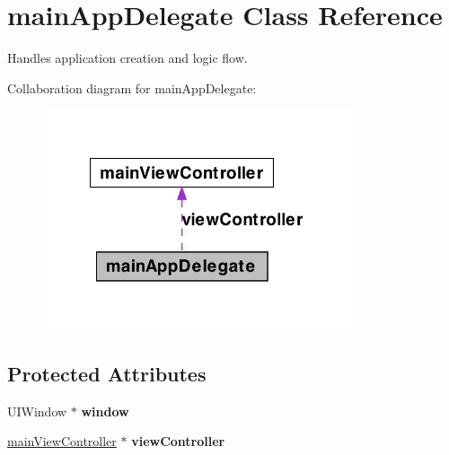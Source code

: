 \hypertarget{interfacemain_app_delegate}{
\section{mainAppDelegate Class Reference}
\label{interfacemain_app_delegate}
}


Handles application creation and logic flow.  




Collaboration diagram for mainAppDelegate:
\nopagebreak
\begin{figure}[H]
\begin{center}
\leavevmode
\includegraphics[width=258pt]{interfacemain_app_delegate__coll__graph}
\end{center}
\end{figure}
\subsection*{Protected Attributes}
\begin{DoxyCompactItemize}
\item 
\hypertarget{interfacemain_app_delegate_a9cfdd8d5a58a043a811ac5af34db51af}{
UIWindow $\ast$ {\bfseries window}}
\label{interfacemain_app_delegate_a9cfdd8d5a58a043a811ac5af34db51af}

\item 
\hypertarget{interfacemain_app_delegate_a53f3ad25ed5c526f2402fa8cbc0b5923}{
\hyperlink{interfacemain_view_controller}{mainViewController} $\ast$ {\bfseries viewController}}
\label{interfacemain_app_delegate_a53f3ad25ed5c526f2402fa8cbc0b5923}

\end{DoxyCompactItemize}
